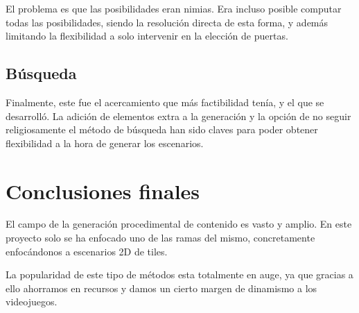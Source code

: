 El problema es que las posibilidades eran nimias. Era incluso posible computar todas las posibilidades, siendo la resolución directa de esta forma, y además limitando la flexibilidad a solo intervenir en la elección de puertas.

\subsection{Búsqueda}

Finalmente, este fue el acercamiento que más factibilidad tenía, y el que se desarrolló. La adición de elementos extra a la generación y la opción de no seguir religiosamente el método de búsqueda han sido claves para poder obtener flexibilidad a la hora de generar los escenarios.

\section{Conclusiones finales}

El campo de la generación procedimental de contenido es vasto y amplio. En este proyecto solo se ha enfocado uno de las ramas del mismo, concretamente enfocándonos a escenarios 2D de tiles.

La popularidad de este tipo de métodos esta totalmente en auge, ya que gracias a ello ahorramos en recursos y damos un cierto margen de dinamismo a los videojuegos.

